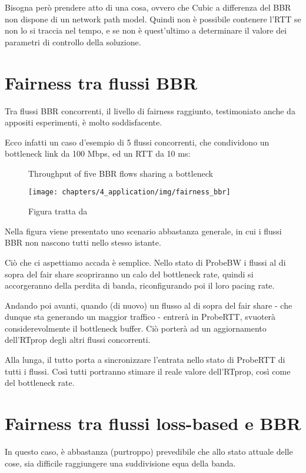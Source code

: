 Bisogna però prendere atto di una cosa, ovvero che Cubic a differenza del BBR non dispone di un network path model. Quindi non è possibile contenere l'RTT se non lo si traccia nel tempo, e se non è quest'ultimo a determinare il valore dei parametri di controllo della soluzione.

\section{Fairness tra flussi BBR}

Tra flussi BBR concorrenti, il livello di fairness raggiunto, testimoniato anche da appositi esperimenti, è molto soddisfacente. \bigskip

Ecco infatti un caso d'esempio di 5 flussi concorrenti, che condividono un bottleneck link da 100 Mbps, ed un RTT da 10 ms:

\begin{figure}[H]

\center
\caption{Throughput of five BBR flows sharing a bottleneck}
\texttt{[image: chapters/4\_application/img/fairness\_bbr]}
\caption*{Figura tratta da \cite[p.~64]{Cardwell:2017:BCC:3042068.3009824}}

\end{figure}

Nella figura viene presentato uno scenario abbastanza generale, in cui i flussi BBR non nascono tutti nello stesso istante. \bigskip

Ciò che ci aspettiamo accada è semplice. Nello stato di ProbeBW i flussi al di sopra del fair share scopriranno un calo del bottleneck rate, quindi si accorgeranno della perdita di banda, riconfigurando poi il loro pacing rate. \bigskip

Andando poi avanti, quando (di nuovo) un flusso al di sopra del fair share - che dunque sta generando un maggior traffico - entrerà in ProbeRTT, svuoterà considerevolmente il bottleneck buffer. Ciò porterà ad un aggiornamento dell'RTprop degli altri flussi concorrenti. \bigskip

Alla lunga, il tutto porta a sincronizzare l'entrata nello stato di ProbeRTT di tutti i flussi. Così tutti portranno stimare il reale valore dell'RTprop, così come del bottleneck rate.

\section{Fairness tra flussi loss-based e BBR}

In questo caso, è abbastanza (purtroppo) prevedibile che allo stato attuale delle cose, sia difficile raggiungere una suddivisione equa della banda. \bigskip

